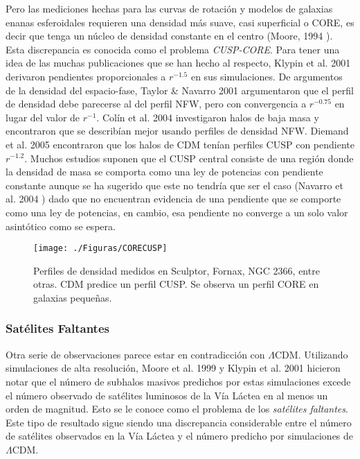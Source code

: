 \documentclass[a4paper,openright,12pt]{book}
\begin{document}
Pero las mediciones hechas para las curvas de rotación y modelos de galaxias enanas esferoidales requieren una densidad más suave, casi superficial o CORE, es decir que tenga un núcleo de densidad constante en el centro (Moore, 1994 \cite{b2}). Esta discrepancia es conocida como el problema \textit{CUSP-CORE}.  Para tener una idea de las muchas publicaciones que se han hecho al respecto, Klypin et al. 2001 \cite{1.2.4} derivaron pendientes proporcionales a $r^{-1.5}$ en sus simulaciones. De argumentos de la densidad del espacio-fase, Taylor \& Navarro 2001 \cite{b26} argumentaron que el perfil de densidad debe parecerse al del perfil NFW, pero con convergencia a $r^{-0.75}$ en lugar del valor de $r^{-1}$. Colín et al. 2004 \cite{b27} investigaron halos de baja masa y encontraron que se describían mejor usando perfiles de densidad NFW. Diemand et al. 2005 \cite{b28} encontraron que los halos de CDM tenían perfiles CUSP con pendiente $r^{-1.2}$. 
Muchos estudios suponen que el CUSP central consiste de una región donde la densidad de masa se comporta como una ley de potencias con pendiente constante aunque se ha sugerido que este no tendría que ser el caso (Navarro et al. 2004 \cite{Navarro Hayashi}) dado que no encuentran evidencia de una pendiente que se comporte como una ley de potencias, en cambio, esa pendiente no converge a un solo valor asintótico como se espera.
\begin{figure}
\centering
  \texttt{[image: ./Figuras/CORECUSP]}
  \caption{\footnotesize{Perfiles de densidad medidos en Sculptor, Fornax, NGC 2366, entre otras. CDM predice un perfil CUSP. Se observa un perfil CORE en galaxias pequeñas.}}
  \label{fig 1.8}
\end{figure}


\subsubsection*{Satélites Faltantes}
Otra serie de observaciones parece estar en contradicción con $\Lambda$CDM. Utilizando simulaciones de alta resolución, Moore et al. 1999 \cite{Moore 1999} y Klypin et al. 2001 \cite{1.2.4} hicieron notar que el número de subhalos masivos predichos por estas simulaciones excede el número observado de satélites luminosos de la Vía Láctea en al menos un orden de magnitud. Esto se le conoce como el problema de los \textit{satélites faltantes}. Este tipo de resultado sigue siendo una discrepancia considerable entre el número de satélites observados en la Vía Láctea y el número predicho por simulaciones de $\Lambda$CDM.
\end{document}
